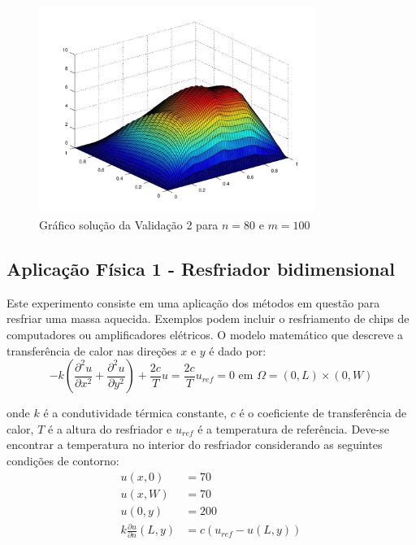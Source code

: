 \documentclass[
	11pt,				%
	oneside,			%
	a4paper,			%
	english,			%
	brazil,				%
	]{article}
\begin{document}
\begin{figure}[h]
    \centering
    \includegraphics[width=0.8\textwidth]{v2_80-100}
    \caption{Gráfico solução da Validação 2 para $n = 80$ e $m = 100$}
    \label{fig:v2_80-100}
\end{figure}

\subsection{Aplicação Física 1 - Resfriador bidimensional} \label{sec:a1}
Este experimento consiste em uma aplicação dos métodos em questão para resfriar 
uma massa aquecida. Exemplos podem incluir o resfriamento de chips de 
computadores ou amplificadores elétricos. O modelo matemático que descreve a 
transferência de calor nas direções $x$ e $y$ é dado por:
\begin{equation} \label{eq:a1}
- k\left(\frac{\partial^2 u}{\partial x^2} + \frac{\partial^2 u}{\partial 
y^2}\right) + \frac{2c}{T}u = \frac{2c}{T}u_{ref} = 0 \text{   em   }
\Omega = (0,L) \times (0, W)
\end{equation}

\noindent onde $k$ é a condutividade térmica constante, $c$ é o coeficiente 
de transferência de calor, $T$ é a altura do resfriador e $u_{ref}$ é a 
temperatura de referência. Deve-se encontrar a temperatura no interior do 
resfriador considerando as seguintes condições de contorno:
\begin{align*}
u(x,0) &= 70\\
u(x,W) &= 70\\
u(0,y) &= 200\\
k\frac{\partial u}{\partial n}(L,y) &= c(u_{ref} - u(L,y))
\end{align*}
\end{document}
